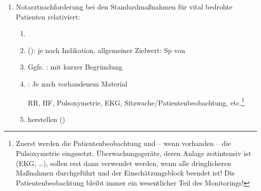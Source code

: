 \documentclass[
ngerman,
paper=a4,
asymmetric,
fontsize=10pt,
headings=small,
draft=false,
numbers=noenddot,
bibtotocnumbered,
footnotes=multiple,
toc=flat,
]{scrreprt}
\newcommand{\Neu}{\fontfamily{lmtt}\fontseries{lc}\selectfont\color{DarkGreen}}
\begin{document}
\begin{enumerate}
{\begin{enumerate}
  \item {} Ergibt sich aus der
  Verdachtsdiagnose, z.\,B. ein Schlaganfall ist sehr
  Zeitkritisch
  \item {} Ergibt sich ebenfalls
  aus der Verdachtsdiagose bzw. dem Patientenzustand, z.\,B.
  ein brodelndes Lungenödem muss zuerst vor Ort behandelt und stabilisiert werden
  bevor der Patient transportfähig ist.
  \item Ggfs. : Wenn
  ein Notarztmittel notwendig sein sollte (z.\,B. Patient hat
  Alarmzeichen, \ldots) muss die erforderliche Zeitspanne
  bis zum Eintreffen bedacht werden (diese ist ggfs. über
  die Leitstelle zu erfragen). Die Verfügbarkeit ist
  abzuwegen gegen die \ldots
  \item {}: Ist die
  erwartete Transportdauer kürzer als die Eintreffzeit eines
  Notarztmittels ist -- sofern der Patient nicht stabilisert
  werden muss -- der Transport oft vorteilhafter. 
  \item {}: Beim Rendez-vous (
  Treffen) treffen sich das Rettungsmittel und das
  Notarztmittel auf der Strecke, sodass einerseits ein
  schneller Transport, und andererseits eine ärztliche
  Versorung ohne große Zeitverzögerung möglich ist. Es
  besteht jedoch ein gewisser Organisationsaufwand, welcher
  sich erst bei größeren Distanzen auszahlt. Daher wird
  diese Strategie eher in ländlichen, und kaum in
  städtischen Gebieten angewendet.
\end{enumerate}
}
    \item Notarztnachforderung bei den Standardmaßnahmen für
    vital bedrohte Patienten relativiert:
    
    {\Neu \begin{enumerate}
  \item {}
  \item {}
  (): je nach Indikation,
  allgemeiner Zielwert: Sp von \PC*
  \item Ggfs.  :
  mit kurzer Begründung
  
  \item {}: Je nach
  vorhandenem Material
  
  RR, HF, Pulsoxymetrie, EKG,
  Sitzwache/Patientenbeobachtung, etc.\footnote{Zuerst werden die Patientenbeobachtung
  und -- wenn vorhanden -- die
  Pulsoxymetrie eingesetzt. Überwachungsgeräte, deren Anlage
  zeitintensiv ist (EKG, \ldots), sollen erst dann verwendet
  werden, wenn alle dringlicheren Maßnahmen durchgeführt und
  der Einschätzungsblock beendet ist! Die
  Patientenbeobachtung bleibt immer ein wesentlicher Teil
  des Monitorings!}
  \item {} herstellen
  ()
\end{enumerate}
}
  \end{enumerate}
\end{document}

